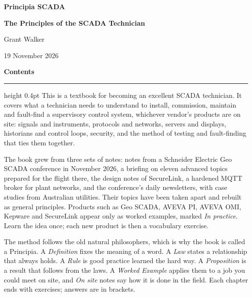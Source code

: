 \thispagestyle{empty}
\begin{center}
\vspace*{5.5cm}
{\fontsize{30}{36}\selectfont\bfseries Principia SCADA\par}
\vspace{6pt}
{\bfseries The Principles of the SCADA Technician\par}
\vspace{5.5cm}
{\large Grant Walker\par}
\vspace{4pt}
19 November 2026\par
\end{center}
\clearpage
\renewcommand{\curchap}{Contents}
{\LARGE\bfseries Contents\par}\vspace{4.8pt}\hrule height 0.4pt\vspace{12pt}
{\setlength{\parskip}{0pt}}
This is a textbook for becoming an excellent SCADA technician. It covers what a technician needs to understand to install, commission, maintain and fault-find a supervisory control system, whichever vendor's products are on site: signals and instruments, protocols and networks, servers and displays, historians and control loops, security, and the method of testing and fault-finding that ties them together.

The book grew from three sets of notes: notes from a Schneider Electric Geo SCADA conference in November 2026, a briefing on eleven advanced topics prepared for the flight there, the design notes of SecureLink, a hardened MQTT broker for plant networks, and the conference's daily newsletters, with case studies from Australian utilities. Their topics have been taken apart and rebuilt as general principles. Products such as Geo SCADA, AVEVA PI, AVEVA OMI, Kepware and SecureLink appear only as worked examples, marked \emph{In practice}. Learn the idea once; each new product is then a vocabulary exercise.

The method follows the old natural philosophers, which is why the book is called a Principia. A \emph{Definition} fixes the meaning of a word. A \emph{Law} states a relationship that always holds. A \emph{Rule} is good practice learned the hard way. A \emph{Proposition} is a result that follows from the laws. A \emph{Worked Example} applies them to a job you could meet on site, and \emph{On site} notes say how it is done in the field. Each chapter ends with exercises; answers are in brackets.

